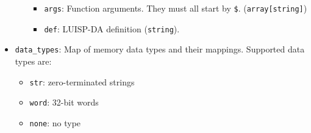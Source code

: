 \begin{itemize}[nosep,noitemsep]
\begin{itemize}
      \begin{itemize}[nosep,noitemsep]
        \item \texttt{args}: Function arguments. They must all start by \texttt{\$}. (\texttt{array[string]})
        \item \texttt{def}: LUISP-DA definition (\texttt{string}).
      \end{itemize}
    \end{itemize}
  \item \texttt{data\_types}: Map of memory data types and their mappings.  
      Supported data types are:
      \begin{itemize}[nosep,noitemsep]
        \item \texttt{str}: zero-terminated strings
        \item \texttt{word}: 32-bit words
        \item \texttt{none}: no type
      \end{itemize}
\end{itemize}